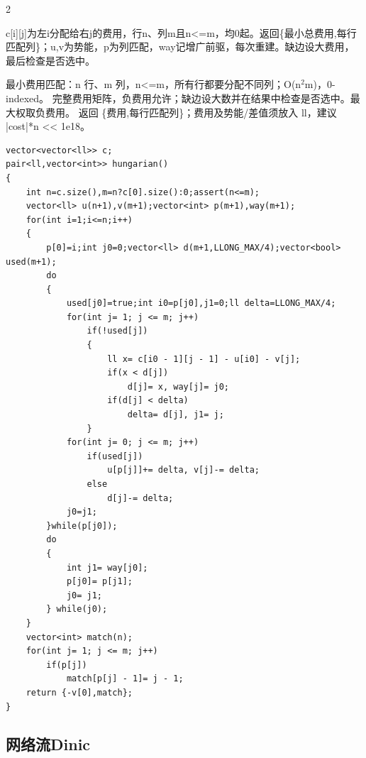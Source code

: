 \documentclass[UTF8,fontset=fandol,a4paper,twoside]{ctexart}
\newcommand{\note}[1]{{\fontsize{10}{12}\selectfont #1\par}}
\begin{document}
\begin{multicols}{2}
\note{c[\allowbreak{}i]\allowbreak{}[\allowbreak{}j]\allowbreak{}为左i分配给右j的费用，行n、列m且n<\allowbreak{}=\allowbreak{}m，均0起。返回\{最小总费用,\allowbreak{}每行匹配列\}；u,\allowbreak{}v为势能，p为列匹配，way记增广前驱，每次重建。缺边设大费用，最后检查是否选中。}
\note{最小费用匹配：n 行、m 列，n<\allowbreak{}=\allowbreak{}m，所有行都要分配不同列；O(\allowbreak{}n\ensuremath{^2}m)\allowbreak{}，0-\allowbreak{}indexed。 完整费用矩阵，负费用允许；缺边设大数并在结果中检查是否选中。最大权取负费用。 返回 \{费用,\allowbreak{}每行匹配列\}；费用及势能/\allowbreak{}差值须放入 ll，建议 |cost|*n <\allowbreak{}<\allowbreak{} 1e18。}
\begin{lstlisting}
vector<vector<ll>> c;
pair<ll,vector<int>> hungarian()
{
    int n=c.size(),m=n?c[0].size():0;assert(n<=m);
    vector<ll> u(n+1),v(m+1);vector<int> p(m+1),way(m+1);
    for(int i=1;i<=n;i++)
    {
        p[0]=i;int j0=0;vector<ll> d(m+1,LLONG_MAX/4);vector<bool> used(m+1);
        do
        {
            used[j0]=true;int i0=p[j0],j1=0;ll delta=LLONG_MAX/4;
            for(int j= 1; j <= m; j++)
                if(!used[j])
                {
                    ll x= c[i0 - 1][j - 1] - u[i0] - v[j];
                    if(x < d[j])
                        d[j]= x, way[j]= j0;
                    if(d[j] < delta)
                        delta= d[j], j1= j;
                }
            for(int j= 0; j <= m; j++)
                if(used[j])
                    u[p[j]]+= delta, v[j]-= delta;
                else
                    d[j]-= delta;
            j0=j1;
        }while(p[j0]);
        do
        {
            int j1= way[j0];
            p[j0]= p[j1];
            j0= j1;
        } while(j0);
    }
    vector<int> match(n);
    for(int j= 1; j <= m; j++)
        if(p[j])
            match[p[j] - 1]= j - 1;
    return {-v[0],match};
}
\end{lstlisting}
\subsection{网络流Dinic}


\end{multicols}
\end{document}
